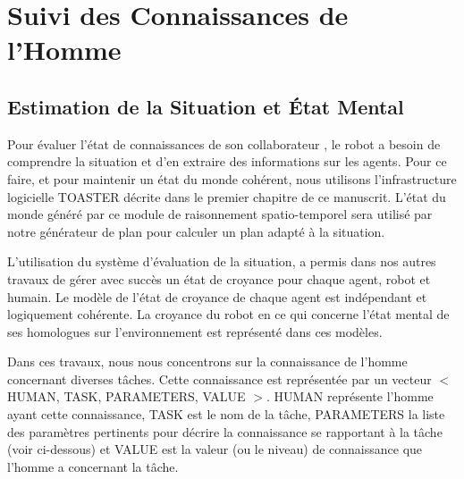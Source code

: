 \documentclass[a4paper,11pt,twoside]{StyleThese}
\begin{document}


\section{Suivi des Connaissances de l'Homme}

\subsection{Estimation de la Situation et État Mental}

Pour évaluer l'état de connaissances de son collaborateur , le robot a besoin de comprendre la situation et d'en extraire des informations sur les agents.
Pour ce faire, et pour maintenir un état du monde cohérent, nous utilisons l'infrastructure logicielle TOASTER décrite dans le premier chapitre de ce manuscrit. L'état du monde généré par ce module de raisonnement spatio-temporel sera utilisé par notre générateur de plan pour calculer un plan adapté à la situation.



L'utilisation du système d'évaluation de la situation, a permis dans nos autres travaux de gérer avec succès un état de croyance pour chaque agent, robot et humain. Le modèle de l'état de croyance de chaque agent est indépendant et logiquement cohérente. La croyance du robot en ce qui concerne l'état mental de ses homologues sur l'environnement est représenté dans ces modèles.

Dans ces travaux, nous nous concentrons sur la connaissance de l'homme concernant diverses tâches. Cette connaissance est représentée par un vecteur $<$ HUMAN, TASK, PARAMETERS, VALUE $> $.
HUMAN représente l'homme ayant cette connaissance, TASK est le nom de la tâche, PARAMETERS la liste des paramètres pertinents pour décrire la connaissance se rapportant à la tâche (voir ci-dessous) et VALUE est la valeur (ou le niveau) de connaissance que l'homme a concernant la tâche.
\end{document}

